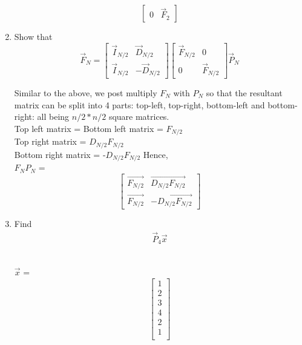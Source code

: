 \documentclass[journal,12pt,twocolumn]{IEEEtran}
\renewcommand\thesection{\arabic{section}}
\begin{document}
\begin{enumerate}[label=\arabic*.,ref=\thesection.\theenumi]
\begin{solution}
\begin{equation}
\begin{bmatrix}
0 & \vec{F}_{2}
\end{bmatrix}
\end{equation}
\end{solution}
\item Show that 
\begin{equation}
\vec{F}_{N}=
\begin{bmatrix}
\vec{I}_{N/2} & \vec{D}_{N/2} \\
\vec{I}_{N/2} & -\vec{D}_{N/2}
\end{bmatrix}
\begin{bmatrix}
\vec{F}_{N/2} & 0 \\
0 & \vec{F}_{N/2}
\end{bmatrix}
\vec{P}_{N}
\end{equation}
\begin{solution}
	Similar to the above, we post multiply $F_{N}$ with $P_{N}$
	so that the resultant matrix can be split into 4 parts:
	top-left, top-right, bottom-left and bottom-right: all being 
	${n/2}*{n/2}$ square matrices.
	\\
	Top left matrix = Bottom left matrix = $F_{N/2}$
	\\
	Top right matrix = $D_{N/2}$$F_{N/2}$
	\\
	Bottom right matrix = -$D_{N/2}$$F_{N/2}$
	Hence,
\\${F_{N}{P_{N}}}$ = 
\begin{equation}
	\begin{bmatrix}
		\vec{F_{N/2}} & \vec{D_{N/2}F_{N/2}} \\
		\vec{F_{N/2}} & -\vec{D_{N/2}F_{N/2}}
	\end{bmatrix}
\end{equation}
\end{solution}
\item Find 
    \begin{align}
	     \vec{P}_4 \vec{x}
    \end{align}
\begin{solution}
	\\
	$\vec{x}$ =
	\\
\begin{equation}
	\begin{bmatrix}
		1 \\
		2 \\
		3 \\
		4 \\
		2 \\
		1 \\
	\end{bmatrix}
\end{equation}

\end{solution}
\end{enumerate}
\end{document}
